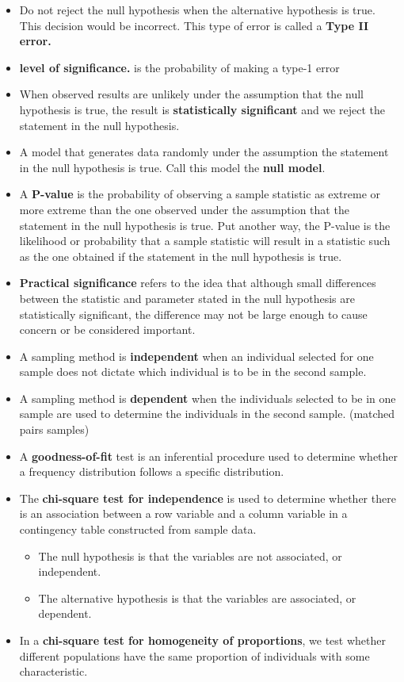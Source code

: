 \documentclass{report}
\begin{document}
\begin{itemize}
          \item Do not reject the null hypothesis when the alternative hypothesis is true. This decision would be incorrect. This type of error is called a \textbf{Type II error.}
          \item \textbf{level of significance.} is the probability of making a type-1 error
          \item When observed results are unlikely under the assumption that the null hypothesis is true, the result is \textbf{statistically significant} and we reject the statement in the null hypothesis.
          \item A model that generates data randomly under the assumption the statement in the null hypothesis is true. Call this model the \textbf{null model}. 
          \item A \textbf{P-value} is the probability of observing a sample statistic as extreme or more extreme than the one observed under the assumption that the statement in the null hypothesis is true. Put another way, the P-value is the likelihood or probability that a sample statistic will result in a statistic such as the one obtained if the statement in the null hypothesis is true.
          \item \textbf{Practical significance} refers to the idea that although small differences between the statistic and parameter stated in the null hypothesis are statistically significant, the difference may not be large enough to cause concern or be considered important. 
          \item A sampling method is \textbf{independent} when an individual selected for one sample does not dictate which individual is to be in the second sample.
          \item A sampling method is \textbf{dependent} when the individuals selected to be in one sample are used to determine the individuals in the second sample. (matched pairs samples)
        \item A \textbf{goodness-of-fit} test is an inferential procedure used to determine whether a frequency distribution follows a specific distribution.
        \item The \textbf{chi-square test for independence} is used to determine whether there is an association between a row variable and a column variable in a contingency table constructed from sample data.
            \begin{itemize}
                \item The null hypothesis is that the variables are not associated, or independent.
                \item The alternative hypothesis is that the variables are associated, or dependent.

            \end{itemize}
        \item In a \textbf{chi-square test for homogeneity of proportions}, we test whether different populations have the same proportion of individuals with some characteristic.

        \end{itemize}
        \bigbreak \noindent 
\end{document}
